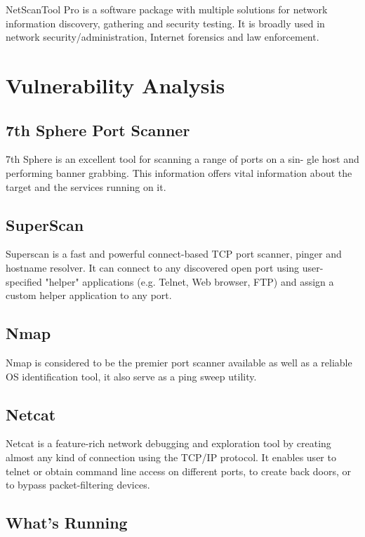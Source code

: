 NetScanTool Pro is a software package with multiple solutions for
network information discovery, gathering and security testing. It is broadly used
in network security/administration, Internet forensics and law enforcement.

\section{Vulnerability Analysis}

\subsection{7th Sphere Port Scanner}

7th Sphere is an excellent tool for scanning a range of ports on a sin-
gle host and performing banner grabbing. This information offers vital information
about the target and the services running on it.

\subsection{SuperScan}

Superscan is a fast and powerful connect-based TCP port scanner,
pinger and hostname resolver. It can connect to any discovered open port using
user-specified "helper" applications (e.g. Telnet, Web browser, FTP) and assign a
custom helper application to any port.

\subsection{Nmap}

Nmap is considered to be the premier port scanner available as well as
a reliable OS identification tool, it also serve as a ping sweep utility.


\subsection{Netcat}

Netcat is a feature-rich network debugging and exploration tool by
creating almost any kind of connection using the TCP/IP protocol. It enables user
to telnet or obtain command line access on different ports, to create back doors, or
to bypass packet-filtering devices.

\subsection{What's Running}

